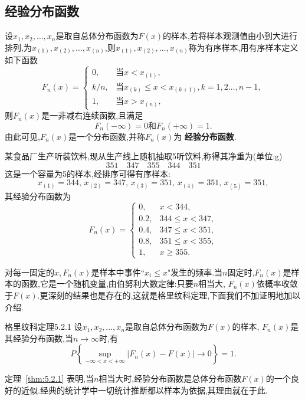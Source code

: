 \subsection{经验分布函数\label{ssec:5.2.1}}
设$x_1,x_2,\dotsc,x_n$是取自总体分布函数为$F(x)$的样本,若将样本观测值由小到大进行排列,为$x_{(1)},x_{(2)},\dotsc,x_{(n)}$,则$x_ {(1)},x_{(2)},\dotsc,x_{(n)}$称为有序样本,用有序样本定义如下函数
\begin{equation}\label{eq:5.2.1}
F_n(x)=\begin{cases}
0,&\text{当}x<x_{(1)},\\
k/n,&\text{当}x_{(k)}\leq x<x_{(k+1)},k=1,2\dotsc,n-1,\\
1,&\text{当}x>x_{(n)},
\end{cases}
\end{equation}
则$F_n(x)$是一非减右连续函数,且满足
\[F_n(-\infty)=0\text{和}F_n(+\infty)=1.\]
由此可见,$F_n(x)$是一个分布函数,并称$F_n(x)$为 \textbf{经验分布函数}.
\begin{example}
某食品厂生产听装饮料,现从生产线上随机抽取5听饮料,称得其净重为(单位:\si{g})
\[351\quad347\quad355\quad344\quad351\]
这是一个容量为5的样本,经排序可得有序样本:
\[x_{(1)}=344,\,x_{(2)}=347,\,x_{(3)}=351,\,x_{(4)}=351,\,x_{(5)}=351,\]
其经验分布函数为
\[F_n(x)=\begin{cases}
0,&x<344,\\
0.2,&344\leq x<347,\\
0.4,&347\le x<351,\\
0.8,&351\le x<355,\\
1,&x\geq355.
\end{cases}\]
\end{example}

对每一固定的$x,F_n(x)$是样本中事件``$x_i\leq x$"发生的频率.当$n$固定时,$F_n(x)$是样本的函数,它是一个随机变量,由伯努利大数定律:只要$n$相当大, $F_n(x)$依概率收敛于$F(x)$.更深刻的结果也是存在的,这就是格里纹科定理,下面我们不加证明地加以介绍.
\begin{theorem}{格里纹科定理}{5.2.1}
设$x_1,x_2,\dotsc,x_n$是取自总体分布函数为$F(x)$的样本, $F_n(x)$是其经验分布函数,当$n\to\infty$时,有
\[P\left\{\sup_{-\infty<x<+\infty}|F_n(x)-F(x)|\to0\right\}=1.\]
\end{theorem}

定理~\ref{thm:5.2.1} 表明,当$n$相当大时,经验分布函数是总体分布函数$F(x)$的一个良好的近似.经典的统计学中一切统计推断都以样本为依据,其理由就在于此.
